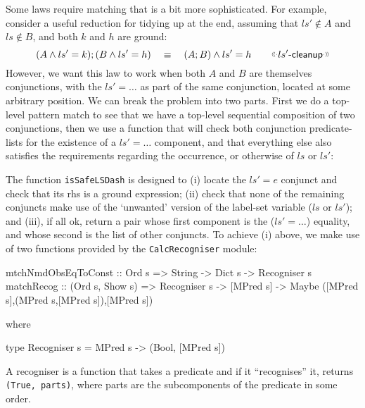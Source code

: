 Some laws require matching that is a bit more sophisticated.
For example,
consider a useful reduction for tidying up at the end,
assuming that $ls' \notin A$ and $ls \notin B$, and both $k$ and $h$
are ground:
\[
   (A \land ls'=k) ; (B \land ls'= h)
   \quad\equiv\quad
   (A;B) \land ls'=h
   \qquad \elabel{$ls'$-cleanup}
\]
However, we want this law to work when both $A$
and $B$ are themselves conjunctions, with the $ls'=\dots$
as part of the same conjunction, located at some arbitrary position.
We can break the problem into two parts.
First we do a top-level pattern match
to see that we have a top-level sequential composition
of two conjunctions,
then we use a function that will check both conjunction predicate-lists
for the existence of a $ls'=\dots$ component,
and that everything else also satisfies the requirements regarding
the occurrence, or otherwise of $ls$ or $ls'$:
The function \texttt{isSafeLSDash}
is designed to
(i) locate the $ls'=e$ conjunct and check that its rhs is a ground expression;
(ii) check that none of the remaining conjuncts make use of the
`unwanted' version of the label-set variable ($ls$ or $ls'$);
and (iii), if all ok, return a pair
whose first component is the ($ls'=\dots$) equality,
and whose second is the list of other conjuncts.
To achieve (i) above,
we make use of two functions provided by the \texttt{CalcRecogniser} module:
\begin{code}
mtchNmdObsEqToConst :: Ord s => String -> Dict s -> Recogniser s
matchRecog :: (Ord s, Show s)
           => Recogniser s -> [MPred s]
           -> Maybe ([MPred s],(MPred s,[MPred s]),[MPred s])
\end{code}
where
\begin{code}
type Recogniser s = MPred s -> (Bool, [MPred s])
\end{code}
A recogniser is a function that takes a predicate
and if it ``recognises'' it, returns \texttt{(True, parts)},
where parts are the subcomponents of the predicate in some order.
